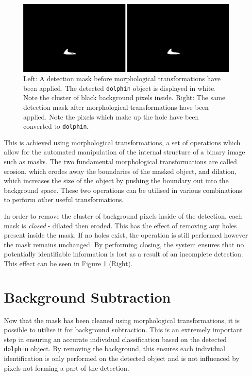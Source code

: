 \begin{figure}[h]
	\begin{center}
		\includegraphics[scale=0.5]{Chapter4/figs/before-and-after-morphing-masks-only.png}
	\end{center}
	\caption{Left: A detection mask before morphological transformations have been applied. The detected \texttt{dolphin} object is displayed in white. Note the cluster of black background pixels inside. Right: The same detection mask after morphological transformations have been applied. Note the pixels which make up the hole have been converted to \texttt{dolphin}.}
	\label{fig:before-and-after-morphing-masks-only}
\end{figure}

This is achieved using morphological transformations, a set of operations which allow for the automated manipulation of the internal structure of a binary image such as masks. The two fundamental morphological transformations are called erosion, which erodes away the boundaries of the masked object, and dilation, which increases the size of the object by pushing the boundary out into the background space. These two operations can be utilised in various combinations to perform other useful transformations.

In order to remove the cluster of background pixels inside of the detection, each mask is \textit{closed} - dilated then eroded. This has the effect of removing any holes present inside the mask. If no holes exist, the operation is still performed however the mask remains unchanged. By performing closing, the system ensures that no potentially identifiable information is lost as a result of an incomplete detection. This effect can be seen in Figure \ref{fig:before-and-after-morphing-masks-only} (Right).

\section{Background Subtraction}\label{ch:postProcessing,sec:bgExtraction}

Now that the mask has been cleaned using morphological transformations, it is possible to utilise it for background subtraction. This is an extremely important step in ensuring an accurate individual classification based on the detected \texttt{dolphin} object. By removing the background, this ensures each individual identification is only performed on the detected object and is not influenced by pixels not forming a part of the detection. 

